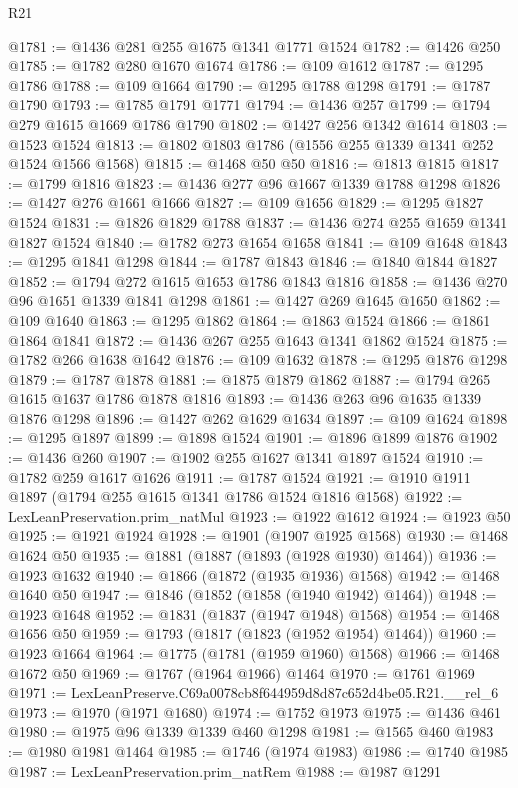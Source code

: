 \begin{lexlean}{R21}
\begin{coremodule}
@1781 := @1436 @281 @255 @1675 @1341 @1771 @1524
@1782 := @1426 @250
@1785 := @1782 @280 @1670 @1674
@1786 := @109 @1612
@1787 := @1295 @1786
@1788 := @109 @1664
@1790 := @1295 @1788 @1298
@1791 := @1787 @1790
@1793 := @1785 @1791 @1771
@1794 := @1436 @257
@1799 := @1794 @279 @1615 @1669 @1786 @1790
@1802 := @1427 @256 @1342 @1614
@1803 := @1523 @1524
@1813 := @1802 @1803 @1786 (@1556 @255 @1339 @1341 @252 @1524 @1566 @1568)
@1815 := @1468 @50 @50
@1816 := @1813 @1815
@1817 := @1799 @1816
@1823 := @1436 @277 @96 @1667 @1339 @1788 @1298
@1826 := @1427 @276 @1661 @1666
@1827 := @109 @1656
@1829 := @1295 @1827 @1524
@1831 := @1826 @1829 @1788
@1837 := @1436 @274 @255 @1659 @1341 @1827 @1524
@1840 := @1782 @273 @1654 @1658
@1841 := @109 @1648
@1843 := @1295 @1841 @1298
@1844 := @1787 @1843
@1846 := @1840 @1844 @1827
@1852 := @1794 @272 @1615 @1653 @1786 @1843 @1816
@1858 := @1436 @270 @96 @1651 @1339 @1841 @1298
@1861 := @1427 @269 @1645 @1650
@1862 := @109 @1640
@1863 := @1295 @1862
@1864 := @1863 @1524
@1866 := @1861 @1864 @1841
@1872 := @1436 @267 @255 @1643 @1341 @1862 @1524
@1875 := @1782 @266 @1638 @1642
@1876 := @109 @1632
@1878 := @1295 @1876 @1298
@1879 := @1787 @1878
@1881 := @1875 @1879 @1862
@1887 := @1794 @265 @1615 @1637 @1786 @1878 @1816
@1893 := @1436 @263 @96 @1635 @1339 @1876 @1298
@1896 := @1427 @262 @1629 @1634
@1897 := @109 @1624
@1898 := @1295 @1897
@1899 := @1898 @1524
@1901 := @1896 @1899 @1876
@1902 := @1436 @260
@1907 := @1902 @255 @1627 @1341 @1897 @1524
@1910 := @1782 @259 @1617 @1626
@1911 := @1787 @1524
@1921 := @1910 @1911 @1897 (@1794 @255 @1615 @1341 @1786 @1524 @1816 @1568)
@1922 := LexLeanPreservation.prim_natMul
@1923 := @1922 @1612
@1924 := @1923 @50
@1925 := @1921 @1924
@1928 := @1901 (@1907 @1925 @1568)
@1930 := @1468 @1624 @50
@1935 := @1881 (@1887 (@1893 (@1928 @1930) @1464))
@1936 := @1923 @1632
@1940 := @1866 (@1872 (@1935 @1936) @1568)
@1942 := @1468 @1640 @50
@1947 := @1846 (@1852 (@1858 (@1940 @1942) @1464))
@1948 := @1923 @1648
@1952 := @1831 (@1837 (@1947 @1948) @1568)
@1954 := @1468 @1656 @50
@1959 := @1793 (@1817 (@1823 (@1952 @1954) @1464))
@1960 := @1923 @1664
@1964 := @1775 (@1781 (@1959 @1960) @1568)
@1966 := @1468 @1672 @50
@1969 := @1767 (@1964 @1966) @1464
@1970 := @1761 @1969
@1971 := LexLeanPreserve.C69a0078cb8f644959d8d87c652d4be05.R21.__rel_6
@1973 := @1970 (@1971 @1680)
@1974 := @1752 @1973
@1975 := @1436 @461
@1980 := @1975 @96 @1339 @1339 @460 @1298
@1981 := @1565 @460
@1983 := @1980 @1981 @1464
@1985 := @1746 (@1974 @1983)
@1986 := @1740 @1985
@1987 := LexLeanPreservation.prim_natRem
@1988 := @1987 @1291

\end{coremodule}
\end{lexlean}
